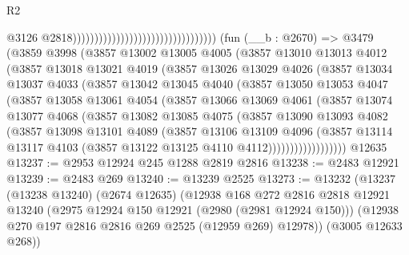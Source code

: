 \begin{lexlean}{R2}
\begin{coremodule}
                                                                      @3126
                                                                      @2818)))))))))))))))))))))))))))))))))
    (fun (__b : @2670) =>
    @3479
      (@3859
        @3998
        (@3857
          @13002
          @13005
          @4005
          (@3857
            @13010
            @13013
            @4012
            (@3857
              @13018
              @13021
              @4019
              (@3857
                @13026
                @13029
                @4026
                (@3857
                  @13034
                  @13037
                  @4033
                  (@3857
                    @13042
                    @13045
                    @4040
                    (@3857
                      @13050
                      @13053
                      @4047
                      (@3857
                        @13058
                        @13061
                        @4054
                        (@3857
                          @13066
                          @13069
                          @4061
                          (@3857
                            @13074
                            @13077
                            @4068
                            (@3857
                              @13082
                              @13085
                              @4075
                              (@3857
                                @13090
                                @13093
                                @4082
                                (@3857
                                  @13098
                                  @13101
                                  @4089
                                  (@3857
                                    @13106
                                    @13109
                                    @4096
                                    (@3857
                                      @13114
                                      @13117
                                      @4103
                                      (@3857 @13122 @13125 @4110 @4112))))))))))))))))))
    @12635
@13237 := @2953 @12924 @245 @1288 @2819 @2816
@13238 := @2483 @12921
@13239 := @2483 @269
@13240 := @13239 @2525
@13273 := @13232
    (@13237
      (@13238 @13240)
      (@2674 @12635)
      (@12938
        @168
        @272
        @2816
        @2818
        @12921
        @13240
        (@2975 @12924 @150 @12921 (@2980 (@2981 @12924 @150)))
        (@12938 @270 @197 @2816 @2816 @269 @2525 (@12959 @269) @12978))
      (@3005 @12633 @268))

\end{coremodule}
\end{lexlean}
